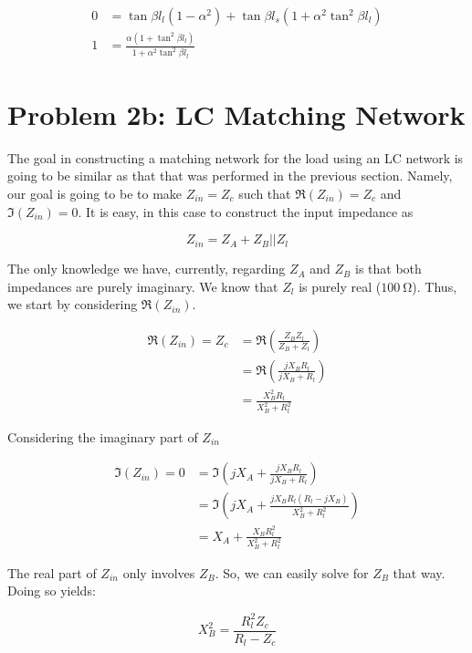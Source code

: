 \begin{align*}
    0 &= \tan \beta l_l \left( 1-\alpha^2 \right) + \tan \beta l_s \left( 1 +
\alpha^2 \tan^2\beta l_l \right) \\
1&= \frac{\alpha \left( 1+\tan^2\beta l_l \right)}{1+\alpha^2 \tan^2\beta l_l}
\end{align*}


\section*{Problem 2b: LC Matching Network}
The goal in constructing a matching network for the load using an LC network is
going to be similar as that that was performed in the previous section. Namely,
our goal is going to be to make $Z_{in} = Z_c$ such that $\Re \left( Z_{in}
\right) = Z_c$ and $\Im \left( Z_{in} \right) = 0$. It is easy, in this case to
construct the input impedance as 

\[ 
        Z_{in} = Z_A + Z_B || Z_l 
\]

The only knowledge we have, currently, regarding $Z_A$ and $Z_B$ is that both
impedances are purely imaginary. We know that $Z_l$ is purely real ($
\SI{100}{\ohm}$). Thus, we start by considering $\Re \left( Z_{in} \right)$.

\begin{align*}
    \Re(Z_{in}) = Z_c &= \Re ( \frac{Z_B Z_l}{Z_B + Z_l} )\\
                      &= \Re ( \frac{j X_B R_l}{j X_B + R_l} ) \\
                      &= \frac{ X_B^2 R_l}{X_B^2 + R_l^2}
\end{align*}

Considering the imaginary part of $Z_{in}$

\begin{align}
    \Im \left( Z_{in} \right) = 0 &= \Im \left( j X_A + \frac{j X_B
    R_l}{j X_B + R_l} \right)	 \\
    &= \Im \left( j X_A + \frac{j X_B R_l \left( R_l - j X_B \right)}{
    X_B^2 + R_l^2} \right) \\
    &= X_A + \frac{ X_B R_l^2}{ X_B^2 + R_l^2}
\end{align}

The real part of $Z_{in}$ only involves $Z_B$. So, we can easily solve for $Z_B$
that way. Doing so yields:

\[ 
    X_B^2 = \frac{R_l^2 Z_c}{R_l-Z_c}
\]

